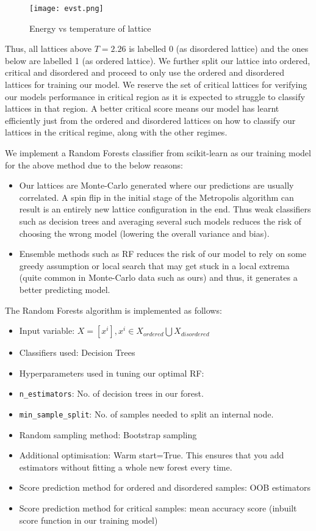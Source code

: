 \begin{figure}[h!]
    \centering
    \texttt{[image: evst.png]}
    \caption{Energy vs temperature of lattice}
\end{figure}


Thus, all lattices above $T=2.26$ is labelled 0 (as disordered lattice) and the ones below are labelled 1 (as ordered lattice).
We further split our lattice into ordered, critical and disordered and proceed to only use the ordered and disordered lattices for training our model.
We reserve the set of critical lattices for verifying our models performance in critical region as it is expected to struggle to classify lattices in that region.
A better critical score means our model has learnt efficiently just from the ordered and disordered lattices on how to classify our lattices in the critical regime, along with the other regimes.

We implement a Random Forests classifier from scikit-learn as our training model for the above method due to the below reasons:

\begin{itemize}
    \item Our lattices are Monte-Carlo generated where our predictions are usually correlated. A spin flip in the initial stage of the Metropolis algorithm can result is an entirely new lattice configuration in the end. Thus weak classifiers such as decision trees and averaging several such models reduces the risk of choosing the wrong model (lowering the overall variance and bias).
    \item Ensemble methods such as RF reduces the risk of our model to rely on some greedy assumption or local search that may get stuck in a local extrema (quite common in Monte-Carlo data such as ours) and thus, it generates a better predicting model.
\end{itemize}

The Random Forests algorithm is implemented as follows:
\begin{itemize}
    \item Input variable: \(X=[x^i],x^i\in {X_{ordered}\bigcup X_{disordered}}\)
    \item Classifiers used: Decision Trees
    \item Hyperparameters used in tuning our optimal RF:
        \item \texttt{n\_estimators}: No. of decision trees in our forest.
        \item \texttt{min\_sample\_split}: No. of samples needed to split an internal node.
    \item Random sampling method: Bootstrap sampling
    \item Additional optimisation: Warm start=True. This ensures that you add estimators without fitting a whole new forest every time.
    \item Score prediction method for ordered and disordered samples: OOB estimators
    \item Score prediction method for critical samples: mean accuracy score (inbuilt score function in our training model)
\end{itemize}

